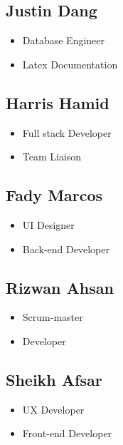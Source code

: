 \documentclass{article}
\begin{document}
\subsection*{Justin Dang}

\begin{itemize}
	\item Database Engineer
    \item Latex Documentation
\end{itemize}

\subsection*{Harris Hamid}

\begin{itemize}
	\item Full stack Developer
	\item Team Liaison
\end{itemize}

\subsection*{Fady Marcos}

\begin{itemize}
    \item UI Designer
	\item  Back-end Developer
\end{itemize}

\subsection*{Rizwan Ahsan}

\begin{itemize}
    \item Scrum-master
	\item Developer
\end{itemize}

\subsection*{Sheikh Afsar}

\begin{itemize}
	\item UX Developer
    \item Front-end Developer
\end{itemize}
\end{document}
